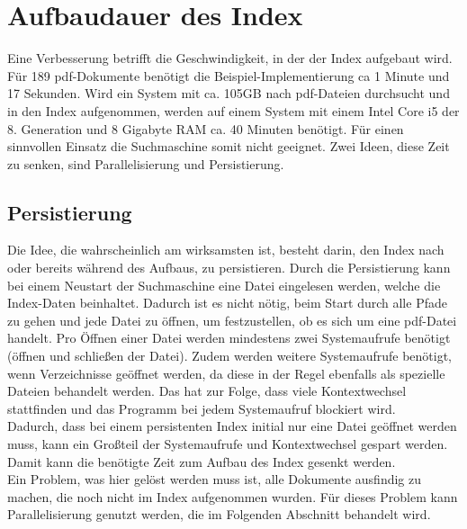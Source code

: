 \section{Aufbaudauer des Index}
Eine Verbesserung betrifft die Geschwindigkeit, in der der Index aufgebaut wird. Für 189 pdf-Dokumente benötigt die Beispiel-Implementierung ca 1 Minute und 17 Sekunden.
Wird ein System mit ca. 105GB nach pdf-Dateien durchsucht und in den Index aufgenommen, werden auf einem System mit einem Intel Core i5 der 8. Generation und 8 Gigabyte RAM ca. 40 Minuten benötigt. Für einen sinnvollen Einsatz die Suchmaschine somit nicht geeignet. Zwei Ideen, diese Zeit zu senken, sind Parallelisierung und Persistierung.

\subsection{Persistierung}
Die Idee, die wahrscheinlich am wirksamsten ist, besteht darin, den Index nach oder bereits während des Aufbaus,  zu persistieren. Durch die Persistierung kann bei einem Neustart der Suchmaschine eine Datei eingelesen werden, welche die Index-Daten beinhaltet. Dadurch ist es nicht nötig, beim Start durch alle Pfade zu gehen und jede Datei zu öffnen, um festzustellen, ob es sich um eine pdf-Datei handelt. Pro Öffnen einer Datei werden mindestens zwei Systemaufrufe benötigt (öffnen und schließen der Datei). Zudem werden weitere Systemaufrufe benötigt, wenn Verzeichnisse geöffnet werden, da diese in der Regel ebenfalls als spezielle Dateien behandelt werden. Das hat zur Folge, dass viele Kontextwechsel stattfinden und das Programm bei jedem Systemaufruf blockiert wird.
\\
Dadurch, dass bei einem persistenten Index initial nur eine Datei geöffnet werden muss, kann ein Großteil der Systemaufrufe und Kontextwechsel gespart werden. Damit kann die benötigte Zeit zum Aufbau des Index gesenkt werden.
\\
Ein Problem, was hier gelöst werden muss ist, alle Dokumente ausfindig zu machen, die noch nicht im Index aufgenommen wurden. Für dieses Problem kann Parallelisierung genutzt werden, die im Folgenden Abschnitt behandelt wird.

